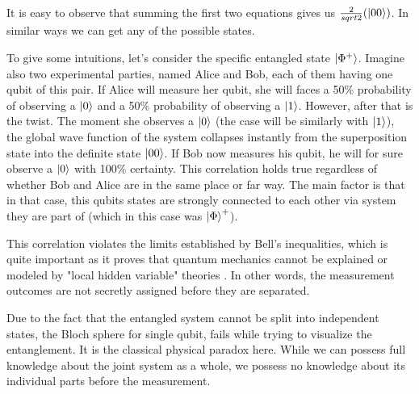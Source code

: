 It is easy to observe that summing the first two equations gives us $\frac{2}{sqrt{2}}(\ket{00})$. In similar ways we can get any of the 
possible states.
%
%

To give some intuitions, let's consider the specific entangled state $\ket{\Phi^+}$.
%
%
Imagine also two experimental parties, named Alice and Bob, each of them having one qubit of this pair.
If Alice will measure her qubit, she will faces a 50\% probability of observing a $\ket{0}$ and a 50\% probability of observing a $\ket{1}$.
%
%
However, after that is the twist. The moment she observes a $\ket{0}$ (the case will be similarly with $\ket{1}$), 
the global wave function of the system collapses instantly from the superposition state into the definite state 
$\ket{00}$.
%
%
If Bob now measures his qubit, he will for sure observe a $\ket{0}$ with 100\% certainty.
%
%
This correlation holds true regardless of whether Bob and Alice are in the same place or far way. The main factor is that in that case, 
this qubits states are strongly connected to each other via system they are part of (which in this case was $\ket{\Phi}^+$).
%
%

This correlation violates the limits established by Bell's inequalities, which is quite important as it proves 
that quantum mechanics cannot be explained or modeled by "local hidden variable" theories \cite{bell1964}.
%
%
In other words, the measurement outcomes are not secretly assigned before they are separated.
%
%

Due to the fact that the entangled system cannot be split into independent states, 
the Bloch sphere for single qubit, fails while trying to visualize the entanglement.
%
%
It is the classical physical paradox here. While we can possess full knowledge about the joint system as a whole, 
we possess no knowledge about its individual parts before the measurement.